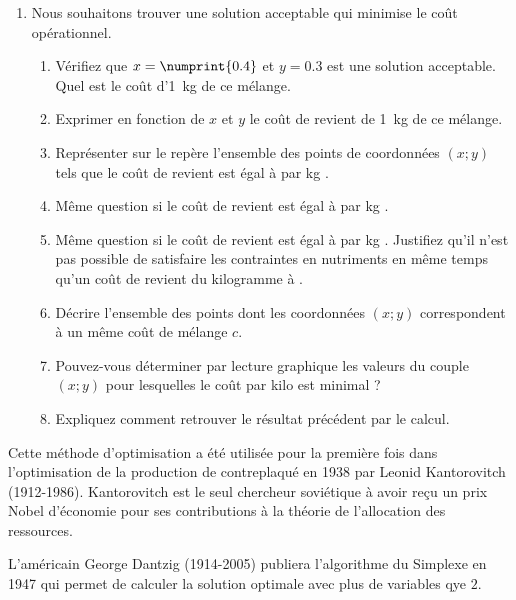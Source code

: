 \documentclass[main.tex]{subfiles}
\begin{document}
\begin{enumerate}[label=\arabic*),leftmargin=*,start=5] 
	\item Nous souhaitons trouver une solution acceptable qui minimise le coût opérationnel.
	\begin{enumerate}[leftmargin=*]
		\item Vérifiez que $x=\numprint{0.4}$ et $y=0.3$ est une solution acceptable. Quel est le coût d'1~\si{\kilo\gram} de ce mélange.
		\vfill 
		\item Exprimer en fonction de $x$ et $y$ le coût de revient de 1~\si{\kilo\gram} de ce mélange.
		\vfill
		\item Représenter sur le repère l'ensemble des points de coordonnées $(x;y)$ tels que le coût de revient est égal à  par \si{\kilo\gram} .
		\vfill
		\item Même question si le coût de revient est égal à  par \si{\kilo\gram} .
		\vfill
		\item Même question si le coût  de revient est égal à  par \si{\kilo\gram} . Justifiez qu'il n'est pas possible de satisfaire les contraintes en nutriments en même temps qu'un coût de revient du kilogramme à .
		\vfill
		\item Décrire l'ensemble des points dont les coordonnées $(x;y)$ correspondent à un même coût de mélange $c$.
		\vfill
		\item Pouvez-vous déterminer par lecture graphique les valeurs du couple $(x;y)$ pour lesquelles le coût par kilo est minimal ?
		\vfill
		\item Expliquez comment retrouver le résultat précédent par le calcul.
		\vfill
	\end{enumerate}
\end{enumerate}
\begin{eBox}
	Cette méthode d'optimisation a été utilisée pour la première fois dans l'optimisation de la production de contreplaqué en 1938 par Leonid Kantorovitch (1912-1986). Kantorovitch est le seul chercheur soviétique à avoir reçu  un prix Nobel d'économie pour ses contributions à la théorie de l'allocation des ressources.
	
	L'américain George Dantzig (1914-2005) publiera l'algorithme du Simplexe en 1947 qui permet de calculer la solution optimale avec plus de variables qye $2$. 
\end{eBox}
\end{document}
